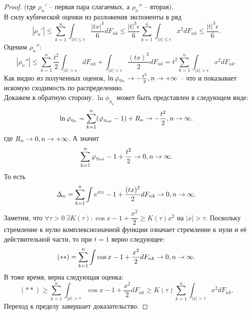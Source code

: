 \begin{proof}
    (где $\rho_n'$ -- первая пара слагаемых, а $\rho_n''$ -- вторая). \\
    В силу кубической оценки из разложения экспоненты в ряд
    \[
        |\rho_n'| \leq \sum\limits_{k = 1}^{n}\int_{|x| \leq \epsilon} \dfrac{|tx|^3}{6}dF_{nk} \leq \dfrac{|t|^3\epsilon}{6}\sum\limits_{k = 1}^{n} \int_{|x| \leq \epsilon} x^2 dF_{nk} \leq \dfrac{|t|^3 \epsilon}{6}.
    \]
    Оценим $\rho_n''$:
    \[
        |\rho_n''| \leq \sum\limits_{k = 1}^{n} \dfrac{t^2}{2} \int_{|x| > \epsilon} dF_{nk} + \int_{|x| > \epsilon} \dfrac{(tx)^2}{2}dF_{nk} = t^2 \sum\limits_{k = 1}^{n}\int_{|x| > \epsilon} x^2 dF_{nk}.
    \]
    Как видно из полученных оценок, $\ln \varphi_{\eta_n} \rightarrow -\frac{t^2}{2}, n \rightarrow +\infty$ -- что и показывает искомую сходимость по распределению. \\
    Докажем в обратную сторону.
    $\ln \phi_{\eta_n}$ может быть представлен в следующем виде:
    \[
        \ln \varphi_{\eta_n} = \sum\limits_{k = 1}^{n} (\varphi_{\eta_{nk}} - 1) + R_n \rightarrow -\dfrac{t^2}{2}, n \rightarrow \infty.
    \]
    где $R_n \rightarrow 0, n \rightarrow +\infty$.
    А значит
    \[
        \sum\limits_{k = 1}^{n} \varphi_{\eta_{nk}} - 1 + \dfrac{t^2}{2} \rightarrow 0, n \rightarrow \infty.
    \]
    То есть
    \[
        \Delta_n = \sum\limits_{k = 1}^{n} \int e^{itx} - 1 + \dfrac{(tx)^2}{2} dF_{nk} \rightarrow 0, n \rightarrow {\infty}.
    \]
    Заметим, что $\forall \tau > 0 \ \exists K(\tau): \cos x - 1 + \dfrac{x^2}{2} \geq K(\tau)x^2$ на $|x| > \tau$.
    Поскольку стремление к нулю комплекснозначной функции означает стремление к нули и её действительной части, то при $t = 1$ верно следующее:
    \[
        (**) =\sum\limits_{k = 1}^{n} \int \cos x - 1 + \dfrac{x^2}{2} dF_{nk} \rightarrow 0, n \rightarrow \infty.
    \]
    В тоже время, верна следующая оценка:
    \[
        (**) \geq \sum\limits_{k = 1}^{n} \int_{|x| > \tau} \cos x - 1 + \dfrac{x^2}{2} dF_{nk} \geq K(\tau) \sum\limits_{k = 1}^{n} \int_{|x| > \tau} x^2 dF_{nk}.
    \]
    Переход к пределу завершает доказательство.
\end{proof}
